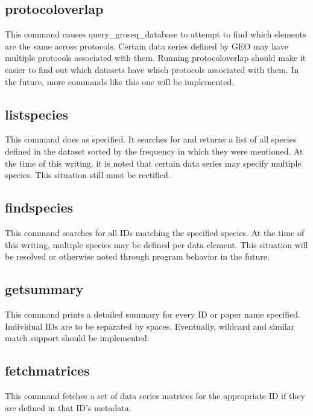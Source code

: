 \documentclass[12pt,letterpaper]{article}
\begin{document}
\subsection{protocoloverlap}
This command causes query\_groseq\_database to attempt to find which elements are the same across protocols. Certain data series defined by GEO may have multiple protocols
associated with them. Running protocoloverlap should make it easier to find out which datasets have which protocols associated with them. In the future, more commands
like this one will be implemented.

\subsection{listspecies}
This command does as specified. It searches for and returns a list of all species defined in the dataset sorted by the frequency in which they were mentioned.
At the time of this writing, it is noted that certain data series may specify multiple species. This situation still must be rectified.

\subsection{findspecies}
This command searches for all IDs matching the specified species. At the time of this writing, multiple species may be defined per data element. This situation 
will be resolved or otherwise noted through program behavior in the future.

\subsection{getsummary}
This command prints a detailed summary for every ID or paper name specified. Individual IDs are to be separated by spaces. Eventually, wildcard and similar
match support should be implemented.

\subsection{fetchmatrices}
This command fetches a set of data series matrices for the appropriate ID if they are defined in that ID's metadata. 
\end{document}
